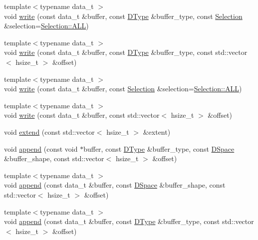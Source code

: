 \begin{DoxyCompactItemize}
\item 
{\footnotesize template$<$typename data\-\_\-t $>$ }\\void \hyperlink{class_h5_t_l_1_1_dataset_a57a932b797520777fb16ebe9161cffd5}{write} (const data\-\_\-t \&buffer, const \hyperlink{class_h5_t_l_1_1_d_type}{D\-Type} \&buffer\-\_\-type, const \hyperlink{class_h5_t_l_1_1_selection}{Selection} \&selection=\hyperlink{class_h5_t_l_1_1_selection_a32d830ebff3c607e0425fa5d6ef72df0}{Selection\-::\-A\-L\-L})
\item 
{\footnotesize template$<$typename data\-\_\-t $>$ }\\void \hyperlink{class_h5_t_l_1_1_dataset_a919ef513e9cd4bb57c796551d4b1d2f7}{write} (const data\-\_\-t \&buffer, const \hyperlink{class_h5_t_l_1_1_d_type}{D\-Type} \&buffer\-\_\-type, const std\-::vector$<$ hsize\-\_\-t $>$ \&offset)
\item 
{\footnotesize template$<$typename data\-\_\-t $>$ }\\void \hyperlink{class_h5_t_l_1_1_dataset_a85346218808829de0cb2c84fa42efe86}{write} (const data\-\_\-t \&buffer, const \hyperlink{class_h5_t_l_1_1_selection}{Selection} \&selection=\hyperlink{class_h5_t_l_1_1_selection_a32d830ebff3c607e0425fa5d6ef72df0}{Selection\-::\-A\-L\-L})
\item 
{\footnotesize template$<$typename data\-\_\-t $>$ }\\void \hyperlink{class_h5_t_l_1_1_dataset_a59c376ac04cbb6f040d3bcf7ddac2c21}{write} (const data\-\_\-t \&buffer, const std\-::vector$<$ hsize\-\_\-t $>$ \&offset)
\item 
void \hyperlink{class_h5_t_l_1_1_dataset_a0a8e406f9036b0e95d6645bc7f17dd85}{extend} (const std\-::vector$<$ hsize\-\_\-t $>$ \&extent)
\item 
void \hyperlink{class_h5_t_l_1_1_dataset_a0db33d74e18e6908a30ee8048a42ae5d}{append} (const void $\ast$buffer, const \hyperlink{class_h5_t_l_1_1_d_type}{D\-Type} \&buffer\-\_\-type, const \hyperlink{class_h5_t_l_1_1_d_space}{D\-Space} \&buffer\-\_\-shape, const std\-::vector$<$ hsize\-\_\-t $>$ \&offset)
\item 
{\footnotesize template$<$typename data\-\_\-t $>$ }\\void \hyperlink{class_h5_t_l_1_1_dataset_af0f65d79e42993b413fdc48760a28bf5}{append} (const data\-\_\-t \&buffer, const \hyperlink{class_h5_t_l_1_1_d_space}{D\-Space} \&buffer\-\_\-shape, const std\-::vector$<$ hsize\-\_\-t $>$ \&offset)
\item 
{\footnotesize template$<$typename data\-\_\-t $>$ }\\void \hyperlink{class_h5_t_l_1_1_dataset_a09b7f1c8bf3d92fd3dfdf0e21138350d}{append} (const data\-\_\-t \&buffer, const \hyperlink{class_h5_t_l_1_1_d_type}{D\-Type} \&buffer\-\_\-type, const std\-::vector$<$ hsize\-\_\-t $>$ \&offset)

\end{DoxyCompactItemize}

